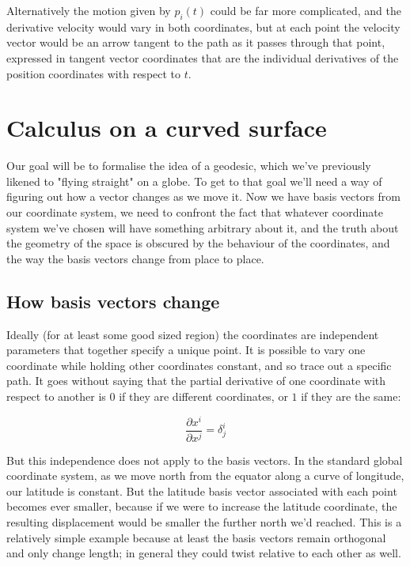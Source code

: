 Alternatively the motion given by $p_i(t)$ could be far more complicated, and the derivative velocity would vary in both coordinates, but at each point the velocity vector would be an arrow tangent to the path as it passes through that point, expressed in tangent vector coordinates that are the individual derivatives of the position coordinates with respect to $t$.

\section{Calculus on a curved surface}

Our goal will be to formalise the idea of a geodesic, which we've previously likened to "flying straight" on a globe. To get to that goal we'll need a way of figuring out how a vector changes as we move it. Now we have basis vectors from our coordinate system, we need to confront the fact that whatever coordinate system we've chosen will have something arbitrary about it, and the truth about the geometry of the space is obscured by the behaviour of the coordinates, and the way the basis vectors change from place to place.

\subsection{How basis vectors change}

Ideally (for at least some good sized region) the coordinates are independent parameters that together specify a unique point. It is possible to vary one coordinate while holding other coordinates constant, and so trace out a specific path. It goes without saying that the partial derivative of one coordinate with respect to another is $0$ if they are different coordinates, or $1$ if they are the same:

$$
\frac{\partial x^i}{\partial x^j} = \delta^i_j
$$

But this independence does not apply to the basis vectors. In the standard global coordinate system, as we move north from the equator along a curve of longitude, our latitude is constant. But the latitude basis vector associated with each point becomes ever smaller, because if we were to increase the latitude coordinate, the resulting displacement would be smaller the further north we'd reached. This is a relatively simple example because at least the basis vectors remain orthogonal and only change length; in general they could twist relative to each other as well.

